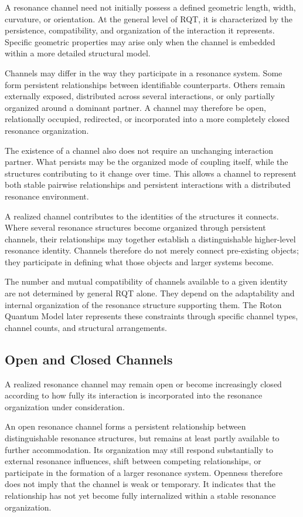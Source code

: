 \documentclass[11pt,a4paper]{article}
\begin{document}
A resonance channel need not initially possess a defined geometric length, width, curvature, or orientation. At the general level of RQT, it is characterized by the persistence, compatibility, and organization of the interaction it represents. Specific geometric properties may arise only when the channel is embedded within a more detailed structural model.

Channels may differ in the way they participate in a resonance system. Some form persistent relationships between identifiable counterparts. Others remain externally exposed, distributed across several interactions, or only partially organized around a dominant partner. A channel may therefore be open, relationally occupied, redirected, or incorporated into a more completely closed resonance organization.

The existence of a channel also does not require an unchanging interaction partner. What persists may be the organized mode of coupling itself, while the structures contributing to it change over time. This allows a channel to represent both stable pairwise relationships and persistent interactions with a distributed resonance environment.

A realized channel contributes to the identities of the structures it connects. Where several resonance structures become organized through persistent channels, their relationships may together establish a distinguishable higher-level resonance identity. Channels therefore do not merely connect pre-existing objects; they participate in defining what those objects and larger systems become.

The number and mutual compatibility of channels available to a given identity are not determined by general RQT alone. They depend on the adaptability and internal organization of the resonance structure supporting them. The Roton Quantum Model later represents these constraints through specific channel types, channel counts, and structural arrangements.


\subsection{Open and Closed Channels}

A realized resonance channel may remain open or become increasingly closed according to how fully its interaction is incorporated into the resonance organization under consideration.

An open resonance channel forms a persistent relationship between distinguishable resonance structures, but remains at least partly available to further accommodation. Its organization may still respond substantially to external resonance influences, shift between competing relationships, or participate in the formation of a larger resonance system. Openness therefore does not imply that the channel is weak or temporary. It indicates that the relationship has not yet become fully internalized within a stable resonance organization.
\end{document}
